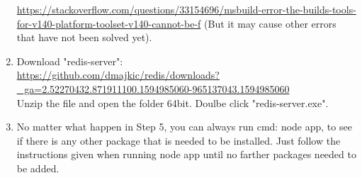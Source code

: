 \documentclass{article}
\begin{document}
\begin{enumerate}
 \url{https://stackoverflow.com/questions/33154696/msbuild-error-the-builds-tools-for-v140-platform-toolset-v140-cannot-be-f}
 (But it may cause other errors that have not been solved yet).
 \item Download "redis-server":\\
 \url{https://github.com/dmajkic/redis/downloads?_ga=2.52270432.871911100.1594985060-965137043.1594985060}\\
 Unzip the file and open the folder 64bit. Doulbe click "redis-server.exe". 
 \item No matter what happen in Step 5, you can always run cmd: node app, to see if there is any other package that is needed to be installed. Just follow the instructions given when running node app until no farther packages needed to be added. 
 
\end{enumerate}
\end{document}
